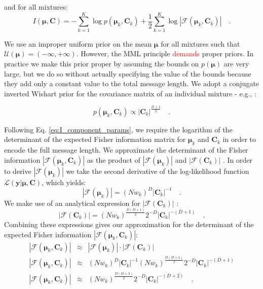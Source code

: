 \documentclass{elsarticle}
\newcommand{\todo}[1]{\textcolor{red}{#1}}
\newcommand{\vect}[1]{\boldsymbol{\mathbf{#1}}}
\def\veccov{\vect{C}}
\def\vecmean{\vect{\mu}}
\def\weight{w}
\def\datum{y}
\def\data{\vect{\datum}}
\def\likelihood{\mathcal{L}}
\newcommand{\fisher}[1]{\mathcal{F}\left(#1\right)}
\newcommand{\detfisher}[1]{\left|\fisher{#1}\right|}
\newcommand{\prior}[1]{p\left(#1\right)}
\begin{document}
\noindent{}and for all mixtures:
\begin{equation}
  I(\vecmean,\veccov) = -\sum_{k=1}^{K}\log{\prior{{\vecmean_k,\veccov_k}}} + \frac{1}{2}\sum_{k=1}^{K}\log{\detfisher{{\vecmean_k,\veccov_k}}} \quad .
  \label{eq:I_component_params}
\end{equation}

We use an improper uniform prior on the mean $\vecmean$ for all mixtures such
that 
    $\mathcal{U}(\vecmean) = (-\infty, +\infty)$.
However,  the MML principle \todo{demands} proper priors. In practice we make 
this prior proper by assuming the bounds on $\prior{\vecmean}$ are very large, but 
we do so without actually specifying the value of the bounds because they add 
only a constant value to the total message length\todo{\cite{someone}}.
We adopt a conjugate inverted Wishart prior for the covariance matrix of an
individual mixture
- e.g.,
\cite[Section 5.2.3]{Schafer_1997}:


\begin{equation}
  \prior{{\vecmean_k, \veccov_k}} \propto |\veccov_k|^{\frac{D+1}{2}} \quad .
  \label{eq:covariance-prior}
\end{equation}


Following Eq. \ref{eq:I_component_params}, we require the logarithm of the
determinant of the expected Fisher information matrix for $\vecmean_k$ and
$\veccov_k$ in order to encode the full message length. We approximate the
determinant of the Fisher information $\detfisher{{\vecmean_k, \veccov_k}}$ 
as the product of $\detfisher{\vecmean_k}$ and $\detfisher{\veccov_k}$ 
\cite{Oliver_1996,Roberts_1998}. In order to derive $\detfisher{\vecmean_k}$
we take the second derivative of the log-likelihood function 
$\likelihood(\data|\vecmean,\veccov)$, which yields:
\begin{equation}
  \detfisher{\vecmean_k} = (N\weight_k)^{D}|\veccov_k|^{-1} \quad .
\end{equation}
We make use of an analytical expression for $\detfisher{\veccov_k}$
\cite{Dwyer_1967,Magnus_1988}:
\begin{equation}
  \detfisher{\veccov_k} = (N\weight_k)^\frac{D(D+1)}{2}2^{-D}|\veccov_k|^{-(D+1)} \quad .
\end{equation}
Combining these expressions gives our approximation for the determinant of
the expected Fisher information $\detfisher{{\vecmean_k,\veccov_k}}$:
\begin{eqnarray}
  \detfisher{{\vecmean_k,\veccov_k}} & \approx & \detfisher{\vecmean_k} \cdot \detfisher{\veccov_k} \nonumber \\
  \detfisher{{\vecmean_k,\veccov_k}} & \approx & (N\weight_k)^{D}|\veccov_k|^{-1}(N\weight_k)^\frac{D(D+1)}{2}2^{-D}|\veccov_k|^{-(D+1)} \nonumber \\
  \detfisher{{\vecmean_k,\veccov_k}} & \approx & (N\weight_k)^\frac{D(D+3)}{2}2^{-D}|\veccov_k|^{-(D+2)} \quad .
  \label{eq:mixture-component-det-fisher}
\end{eqnarray}
\end{document}
